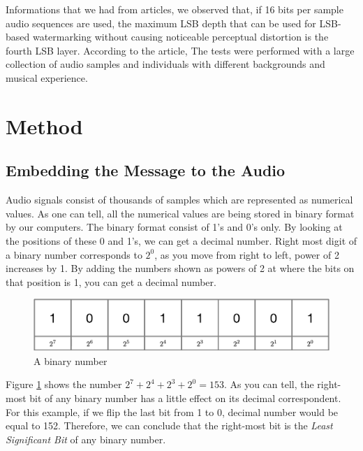\documentclass[twocolumns]{IEEEtran}
\begin{document}
	
	Informations that we had from articles, we observed that, if
	16 bits per sample audio sequences are used,  the maximum LSB depth that
	can be used for LSB-based watermarking without causing
	noticeable perceptual distortion is the fourth LSB layer\cite{Jayaram}. According to the article, The tests
	were performed with a large collection of audio samples
	and individuals with different backgrounds and musical
	experience.
	
	\section{Method}
	\subsection{Embedding the Message to the Audio}
	Audio signals consist of thousands of samples which are represented as numerical values. As one can tell, all the numerical values are being stored in binary format by our computers. The binary format consist of 1's and 0's only. By looking at the positions of these 0 and 1's, we can get a decimal number\cite{Jayaram}. Right most digit of a binary number corresponds to $2^0$, as you move from right to left, power of 2 increases by 1. By adding the numbers shown as powers of 2 at where the bits on that position is 1, you can get a decimal number.
	\begin{figure}[h]
		\centering
		\includegraphics[scale=.5]{binary_num.eps}
		\caption{A binary number}
		\label{fig:binary}
	\end{figure}

	Figure \ref{fig:binary} shows the number $2^7 + 2^4 + 2^3 + 2^0 = 153$. As you can tell, the right-most bit of any binary number has a little effect on its decimal correspondent. For this example, if we flip the last bit from 1 to 0, decimal number would be equal to 152. Therefore, we can conclude that the right-most bit is the \textit{Least Significant Bit} of any binary number.
	
\end{document}
